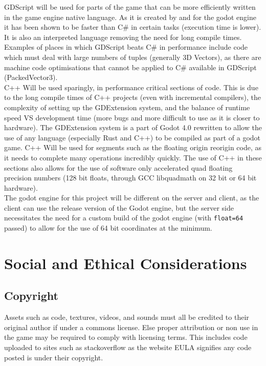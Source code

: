 \documentclass[12pt, DIV=calc]{scrartcl}
\begin{document}
\noindent GDScript will be used for parts of the game that can be more efficiently written in the game engine native language. As it is created by and for the godot engine it has been shown to be faster than C\# in certain tasks (execution time is lower). It is also an interpreted language removing the need for long compile times. Examples of places in which GDScript beats C\# in performance include code which must deal with large numbers of tuples (generally 3D Vectors), as there are machine code optimisations that cannot be applied to C\# available in GDScript (PackedVector3). \\

\noindent C++ Will be used sparingly, in performance critical sections of code. This is due to the long compile times of C++ projects (even with incremental compilers), the complexity of setting up the GDExtension system, and the balance of runtime speed VS development time (more bugs and more difficult to use as it is closer to hardware). The GDExtension system is a part of Godot 4.0 rewritten to allow the use of any language (especially Rust and C++) to be compiled as part of a godot game. C++ Will be used for segments such as the floating origin reorigin code, as it needs to complete many operations incredibly quickly. The use of C++ in these sections also allows for the use of software only accelerated quad floating precision numbers (128 bit floats, through GCC libquadmath on 32 bit or 64 bit hardware). \\

\noindent The godot engine for this project will be different on the server and client, as the client can use the release version of the Godot engine, but the server side necessitates the need for a custom build of the godot engine (with \texttt{float=64} passed) to allow for the use of 64 bit coordinates at the minimum.  



\section{Social and Ethical Considerations}
\subsection{Copyright}
Assets such as code, textures, videos, and sounds must all be credited to their original author if under a commons license. Else proper attribution or non use in the game may be required to comply with licensing terms. This includes code uploaded to sites such as stackoverflow as the website EULA signifies any code posted is under their copyright. \\ 
\end{document}
